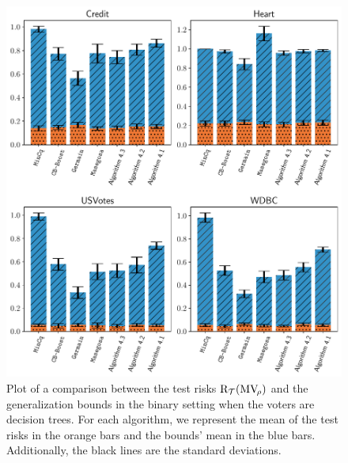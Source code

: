 \begin{figure}
    \centering
    \includegraphics[width=1.0\linewidth]{chapter_4/figures/tree_binary_1.pdf}
    \caption[Comparison Between the Test Risks and the Bounds (3/6)]{
    Plot of a comparison between the test risks $\text{R}_{\mathcal{T}}(\text{MV}_{\!\rho})$ and the generalization bounds in the binary setting when the voters are decision trees.
    For each algorithm, we represent the mean of the test risks in the orange bars and the bounds' mean in the blue bars.
    Additionally, the black lines are the standard deviations. 
    }
    \label{chap:mv:fig:tree-binary-1}
\end{figure}


